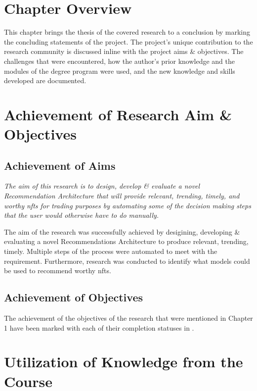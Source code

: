 \section{Chapter Overview}
This chapter brings the thesis of the covered research to a conclusion by marking the concluding statements of the project. The project's unique contribution to the research community is discussed inline with the project aims \& objectives. The challenges that were encountered, how the author's prior knowledge and the modules of the degree program were used, and the new knowledge and skills developed are documented.


\section{Achievement of Research Aim \& Objectives}

\subsection{Achievement of Aims}
\textit{The aim of this research is to design, develop \& evaluate a novel Recommendation Architecture that will provide relevant, trending, timely, and worthy \gls{nft}s for trading purposes by automating some of the decision making steps that the user would otherwise have to do manually.}

The aim of the research was successfully achieved by desigining, developing \& evaluating a novel Recommendations Architecture to produce relevant, trending, timely. Multiple steps of the process were automated to meet with the requirement. Furthermore, research was conducted to identify what models could be used to recommend worthy \gls{nft}s.

\subsection{Achievement of Objectives}
The achievement of the objectives of the research that were mentioned in Chapter 1 have been marked with each of their completion statuses in \textit{}.


\section{Utilization of Knowledge from the Course}


